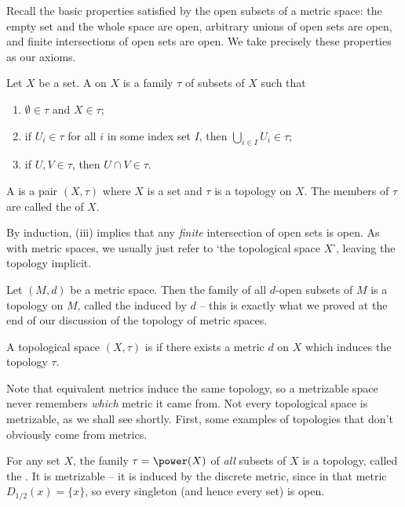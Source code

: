 Recall the basic properties satisfied by the open subsets of a metric space: the empty set and the whole space are open, arbitrary unions of open sets are open, and finite intersections of open sets are open. We take precisely these properties as our axioms.

\begin{definition}[Topology]
    Let $X$ be a set. A  on $X$ is a family $\tau$ of subsets of $X$ such that
    \begin{enumerate}[label=(\roman*)]
        \item $\emptyset \in \tau$ and $X \in \tau$;
        \item if $U_i \in \tau$ for all $i$ in some index set $I$, then $\bigcup_{i \in I} U_i \in \tau$;
        \item if $U, V \in \tau$, then $U \cap V \in \tau$.
    \end{enumerate}
    A  is a pair $(X, \tau)$ where $X$ is a set and $\tau$ is a topology on $X$. The members of $\tau$ are called the  of $X$.
\end{definition}

By induction, (iii) implies that any \emph{finite} intersection of open sets is open. As with metric spaces, we usually just refer to `the topological space $X$', leaving the topology implicit.

\begin{example}
    Let $(M, d)$ be a metric space. Then the family of all $d$-open subsets of $M$ is a topology on $M$, called the  induced by $d$ -- this is exactly what we proved at the end of our discussion of the topology of metric spaces.
\end{example}

\begin{definition}[Metrizable]
    A topological space $(X, \tau)$ is  if there exists a metric $d$ on $X$ which induces the topology $\tau$.
\end{definition}

Note that equivalent metrics induce the same topology, so a metrizable space never remembers \emph{which} metric it came from. Not every topological space is metrizable, as we shall see shortly. First, some examples of topologies that don't obviously come from metrics.

\begin{example}
    For any set $X$, the family $\tau = \power(X)$ of \emph{all} subsets of $X$ is a topology, called the . It is metrizable -- it is induced by the discrete metric, since in that metric $D_{1/2}(x) = \{x\}$, so every singleton (and hence every set) is open.
\end{example}

